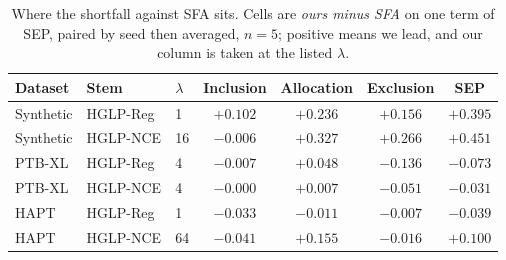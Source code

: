 \begin{table}[H]
\caption{Where the shortfall against SFA sits. Cells are \emph{ours minus SFA} on one
term of SEP, paired by seed then averaged, $n=5$; positive means we lead, and our column is
taken at the listed $\lambda$.}
\label{tab:terms}
\centering
\small
\begin{tabular}{lllcccc}
\hline
Dataset & Stem & $\lambda$ & Inclusion & Allocation & Exclusion & SEP \\
\hline
Synthetic & HGLP-Reg & 1 & $+0.102$ & $+0.236$ & $+0.156$ & $+0.395$ \\
Synthetic & HGLP-NCE & 16 & $-0.006$ & $+0.327$ & $+0.266$ & $+0.451$ \\
PTB-XL & HGLP-Reg & 4 & $-0.007$ & $+0.048$ & $\mathbf{-0.136}$ & $-0.073$ \\
PTB-XL & HGLP-NCE & 4 & $-0.000$ & $+0.007$ & $\mathbf{-0.051}$ & $-0.031$ \\
HAPT & HGLP-Reg & 1 & $-0.033$ & $-0.011$ & $-0.007$ & $-0.039$ \\
HAPT & HGLP-NCE & 64 & $-0.041$ & $+0.155$ & $-0.016$ & $+0.100$ \\
\hline
\end{tabular}
\end{table}
